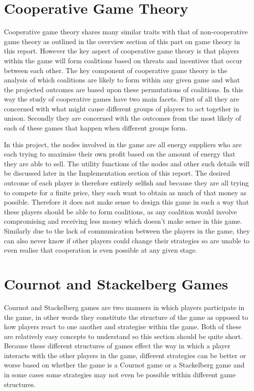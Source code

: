 \documentclass[a4paper, notitlepage]{report}
\begin{document}
\section{Cooperative Game Theory}
\label{sec:org6973b55}
Cooperative game theory shares many similar traits with that of non-cooperative
game theory as outlined in the overview section of this part on game theory in
this report. However the key aspect of cooperative game theory is that players
within the game will form coalitions based on threats and incentives that occur
between each other. The key component of cooperative game theory is the
analysis of which coalitions are likely to form within any given game and what
the projected outcomes are based upon these permutations of coalitions. In this
way the study of cooperative games have two main facets. First of all they are
concerned with what might cause different groups of players to act together in
unison. Secondly they are concerned with the outcomes from the most likely of
each of these games that happen when different groups form.

In this project, the nodes involved in the game are all energy suppliers who are
each trying to maximise their own profit based on the amount of energy that they
are able to sell. The utility functions of the nodes and other such details will
be discussed later in the Implementation section of this report. The desired
outcome of each player is therefore entirely selfish and because they are all
trying to compete for a finite price, they each want to obtain as much of that
money as possible. Therefore it does not make sense to design this game in such
a way that these players should be able to form coalitions, as any coalition
would involve compromising and receiving less money which doesn't make sense in
this game. Similarly due to the lack of communication between the players in the
game, they can also never know if other players could change their strategies so
are unable to even realise that cooperation is even possible at any given stage.
\section{Cournot and Stackelberg Games}
\label{sec:orge1534d6}
Cournot and Stackelberg games are two manners in which players participate in
the game, in other words they constitute the structure of the game as opposed to
how players react to one another and strategise within the game. Both of these
are relatively easy concepts to understand so this section should be quite
short. Because these different structures of games effect the way in which a
player interacts with the other players in the game, different strategies can be
better or worse based on whether the game is a Cournot game or a Stackelberg
game and in some cases some strategies may not even be possible within different
game structures.
\end{document}
